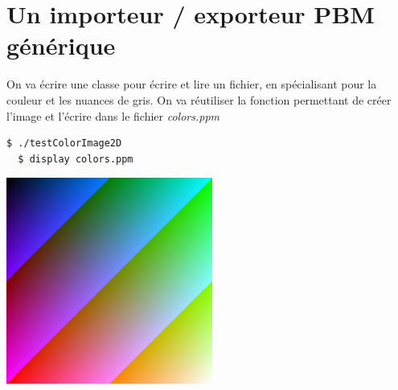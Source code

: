 \documentclass[a4paper,10pt]{article}
\begin{document}
    \section{Un importeur / exporteur PBM générique}
    On va écrire une classe pour écrire et lire un fichier, en spécialisant pour la couleur et les nuances de gris. On va réutiliser la fonction permettant de créer l'image et l'écrire dans le fichier  \emph{colors.ppm}
    \begin{lstlisting}[language=Bash]
  $ ./testColorImage2D
  $ display colors.ppm
  \end{lstlisting}
  \begin{center}
    \includegraphics[scale=0.75]{colors}
    \end{center}
    \pagebreak
\end{document}

